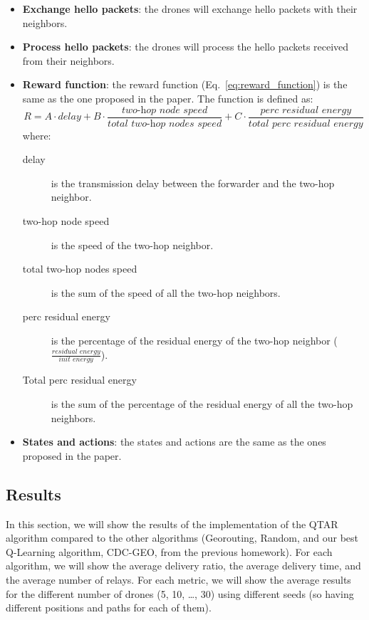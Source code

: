 \begin{itemize}
    \item \textbf{Exchange hello packets}: the drones will exchange hello packets with their neighbors.
    \item \textbf{Process hello packets}: the drones will process the hello packets received from their neighbors.
    \item \textbf{Reward function}: the reward function (Eq.~\ref{eq:reward_function}) is the same as the one proposed in the paper. The function is defined as:
          \begin{equation}
              \label{eq:reward_function}
              R = A \cdot {\textit{delay}} + B \cdot \frac{\textit{two-hop node speed}}{\textit{total two-hop nodes speed}} + C \cdot \frac{\textit{perc residual energy}}{\textit{total perc residual energy}}
          \end{equation}
          where:
          \begin{description}
              \item[delay] is the transmission delay between the forwarder and the two-hop neighbor.
              \item[two-hop node speed] is the speed of the two-hop neighbor.
              \item[total two-hop nodes speed] is the sum of the speed of all the two-hop neighbors.
              \item[perc residual energy] is the percentage of the residual energy of the two-hop neighbor ($\frac{\textit{residual energy}}{\textit{init energy}}$).
              \item[Total perc residual energy] is the sum of the percentage of the residual energy of all the two-hop neighbors.
          \end{description}
    \item \textbf{States and actions}: the states and actions are the same as the ones proposed in the paper.
\end{itemize}



\subsection{Results}
In this section, we will show the results of the implementation of the QTAR algorithm compared to the other algorithms (Georouting, Random, and our best Q-Learning algorithm, CDC-GEO, from the previous homework).
For each algorithm, we will show the average delivery ratio, the average delivery time, and the average number of relays.
For each metric, we will show the average results for the different number of drones (5, 10, \ldots, 30) using different seeds (so having different positions and paths for each of them).


